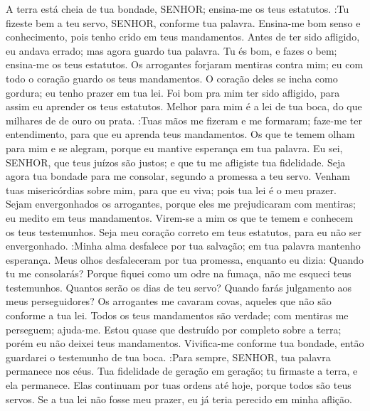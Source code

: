 {A terra está cheia de tua bondade, SENHOR; ensina-me os teus estatutos.
 :Tu fizeste bem a teu servo, SENHOR, conforme tua palavra.
Ensina-me bom senso e conhecimento, pois tenho crido em teus mandamentos.
Antes de ter sido afligido, eu andava errado; mas agora guardo tua palavra.
Tu és bom, e fazes o bem; ensina-me os teus estatutos.
Os arrogantes forjaram mentiras contra mim;
{} eu com todo o
{} coração guardo os teus mandamentos.
O coração deles se incha como gordura;
{} eu tenho prazer em tua lei.
Foi bom pra mim ter sido afligido, para assim eu aprender os teus estatutos.
Melhor para mim é a lei de tua boca, do que milhares de
{} de ouro ou prata.
 :Tuas mãos me fizeram e me formaram; faze-me ter entendimento, para que eu aprenda teus mandamentos.
Os que te temem olham para mim e se alegram, porque eu mantive esperança em tua palavra.
Eu sei, SENHOR, que teus juízos são justos; e que tu me afligiste
{} tua fidelidade.
Seja agora tua bondade para me consolar, segundo a promessa
{} a teu servo.
Venham tuas misericórdias sobre mim, para que eu viva; pois tua lei é o meu prazer.
Sejam envergonhados os arrogantes, porque eles me prejudicaram com mentiras;
{} eu medito em teus mandamentos.
Virem-se a mim os que te temem e conhecem os teus testemunhos.
Seja meu coração correto em teus estatutos, para eu não ser envergonhado.
 :Minha alma desfalece por tua salvação; em tua palavra mantenho esperança.
Meus olhos desfaleceram por tua promessa, enquanto eu dizia: Quando tu me consolarás?
Porque fiquei como um odre na fumaça,
{} não me esqueci teus testemunhos.
Quantos serão os dias de teu servo? Quando farás julgamento aos meus perseguidores?
Os arrogantes me cavaram covas, aqueles que não são conforme a tua lei.
Todos os teus mandamentos são verdade; com mentiras me perseguem; ajuda-me.
Estou quase que destruído por completo sobre a terra; porém eu não deixei teus mandamentos.
Vivifica-me conforme tua bondade, então guardarei o testemunho de tua boca.
 :Para sempre, SENHOR, tua palavra permanece nos céus.
Tua fidelidade
{} de geração em geração; tu firmaste a terra, e
{} ela permanece.
Elas continuam por tuas ordens até hoje, porque todos são teus servos.
Se a tua lei não fosse meu prazer, eu já teria perecido em minha aflição.
}
